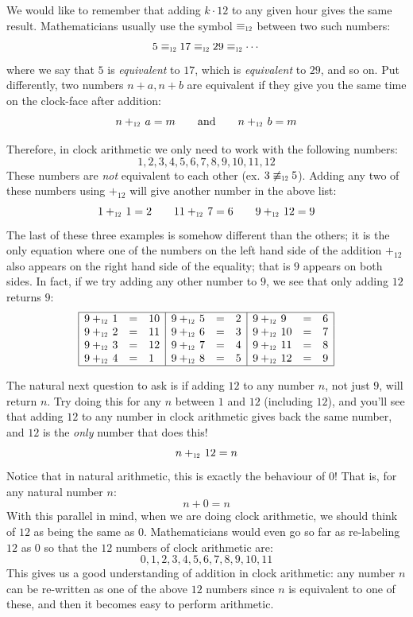 \documentclass{article}
\newcommand\scalemath[2]{\scalebox{#1}{\mbox{\ensuremath{\displaystyle #2}}}}
\newcommand{\Equiv}[1]{\equiv_{\scalemath{0.6}{#1}}}
\newcommand{\Plus}[1]{+_{\scalemath{0.6}{#1}}\,}
\begin{document}
We would like to remember that adding $k\cdot 12$ to any given hour gives
the same result. Mathematicians usually use the symbol $\Equiv{12}$ between two such numbers:
\[
  5\Equiv{12}17\Equiv{12}29\Equiv{12}\cdots
\]
where we say that $5$ is \emph{equivalent} to $17$, which is \emph{equivalent} to $29$, and so on. Put
differently, two numbers $n+a,n+b$ are equivalent if they give you the same time on the clock-face after addition:
\[
  n\Plus{12}a = m \qquad \text{and} \qquad n\Plus{12}b= m
\]

Therefore, in clock arithmetic we only need to work with the following numbers:
\[
  1,2,3,4,5,6,7,8,9,10,11,12
\]
These numbers are \emph{not} equivalent to each other (ex. $3\not\Equiv{12}5$). Adding any two of these
numbers using $+_{12}$ will give another number in the above list:
\[
  1\Plus{12}1 = 2\qquad 11\Plus{12}7 = 6 \qquad 9\Plus{12}12 = 9
\]
The last of these three examples is somehow different than the others; it is the only equation where one of
the numbers on the left hand side of the addition $+_{12}$ also appears on the right hand side of the
equality; that is $9$ appears on both sides. In fact, if we try adding any other number to $9$, we see that only adding $12$ returns $9$:
\[\begin{array}{|lcl|lcl|lcl|}
  \hline
9\Plus{12}1 &=& 10 & 9\Plus{12}5 &=& 2 & 9\Plus{12}9 &=& 6 \\
9\Plus{12}2 &=& 11 & 9\Plus{12}6 &=& 3 & 9\Plus{12}10 &=& 7 \\
9\Plus{12}3 &=& 12 & 9\Plus{12}7 &=& 4 & 9\Plus{12}11 &=& 8 \\
9\Plus{12}4 &=& 1 & 9\Plus{12}8 &=& 5 & 9\Plus{12}12 &=& 9\\
\hline
\end{array}\]

The natural next question to ask is if adding $12$ to any number $n$, not just $9$, will return $n$. Try doing
this for any $n$ between $1$ and $12$ (including $12$), and you'll see that adding $12$ to any number in clock
arithmetic gives back the same number, and $12$ is the \emph{only} number that does this!
\[
  n \Plus{12}12 = n
\]
Notice that in natural arithmetic, this is exactly the behaviour of $0$! That is, for any natural number $n$:
\[
  n + 0 = n
\]
With this parallel in mind, when we are doing clock arithmetic, we should think of $12$ as being the same
as $0$. Mathematicians would even go so far as re-labeling $12$ as $0$ so that the $12$ numbers of
clock arithmetic are:
\[
  0,1,2,3,4,5,6,7,8,9,10,11
\]
This gives us a good understanding of addition in clock arithmetic: any number $n$ can be re-written as one of
the above $12$ numbers since $n$ is equivalent to one of these, and then it becomes easy to perform
arithmetic.
\end{document}
